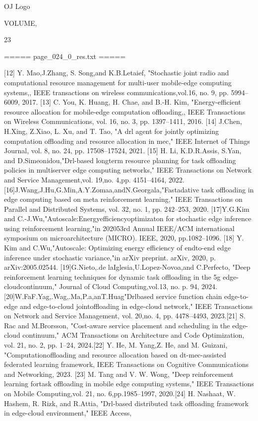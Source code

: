 \documentclass{article}
\begin{document}
OJ Logo

VOLUME,

23

===== page\_024\_0\_res.txt =====


[12] Y. Mao,J.Zhang, S. Song,and K.B.Letaief, "Stochastic joint radio and computational resource management for multi-user mobile-edge computing systems,, IEEE transactions on wireless communications,vol.16, no. 9, pp. 5994–6009, 2017.
[13] C. You, K. Huang, H. Chae, and B.-H. Kim, "Energy-efficient resource allocation for mobile-edge computation offloading,,  IEEE Transactions on Wireless Communications, vol. 16, no. 3, pp. 1397–1411,
2016.
[14] J.Chen, H.Xing, Z.Xiao, L. Xu, and T. Tao, "A drl agent for jointly optimizing computation offloading and resource allocation in mec,"
IEEE Internet of Things Journal, vol. 8, no. 24, pp. 17508–17524,
2021.
[15] H. Li, K.D.R.Assis, S.Yan, and D.Simeonidou,"Drl-based longterm resource planning for task offloading policies in multiserver edge computing networks," IEEE Transactions on Network and Service Management,vol. 19,no. 4,pp. 4151–4164, 2022.[16]J.Wang,J.Hu,G.Min,A.Y.Zomaa,andN.Georgala,"Fastadative task offloading in edge computing based on meta reinforcement learning," IEEE Transactions on Parallel and Distributed Systems,
vol. 32, no. 1, pp. 242–253, 2020.
[17]Y.G.Kim and C.-J.Wu,"Autoscale:Energyefficiencyoptimizaton for stochastic edge inference using reinforcement learning,"in 202053rd Annual IEEE/ACM international symposium on microarchitecture (MICRO). IEEE, 2020, pp.1082–1096.
[18] Y. Kim and C.Wu,"Autoscale: Optimizing energy efficiency of endto-end edge inference under stochastic variance,"in arXiv preprint.
arXiv, 2020, p. arXiv:2005.02544.
[19]G.Nieto,.de laIglesia,U.Lopez-Novoa,and C.Perfecto, "Deep reinforcement learning techniques for dynamic task offloading in the 5g edge-cloudcontinuum," Journal of Cloud Computing,vol.13, no.
p. 94, 2024.
[20]W.FaF.Yag,.Wag,.Ma,P.a,anT.Huag"Drlbased service function chain edge-to-edge and edge-to-cloud jointoffloading in edge-cloud network," IEEE Transactions on Network and Service Management, vol. 20,no. 4, pp. 4478–4493, 2023.[21] S. Rac and M.Brorsson, "Cost-aware service placement and scheduling in the edge-cloud continuum," ACM Transactions on Architecture and Code Optimization, vol. 21, no. 2, pp. 1–24, 2024.[22] Y. He, M. Yang,Z. He, and M. Guizani, "Computationoffloading and resource allocation based on dt-mec-assisted federated learning framework,  IEEE Transactions on Cognitive Communications and Networking, 2023.
[23] M. Tang and V. W. Wong, "Deep reinforcement learning fortask offloading in mobile edge computing systems," IEEE Transactions on Mobile Computing,vol. 21, no. 6,pp.1985–1997, 2020.[24] H. Nashaat, W. Hashem, R. Rizk, and R.Attia, "Drl-based distributed task offloading framework in edge-cloud environment," IEEE Access,
\end{document}
